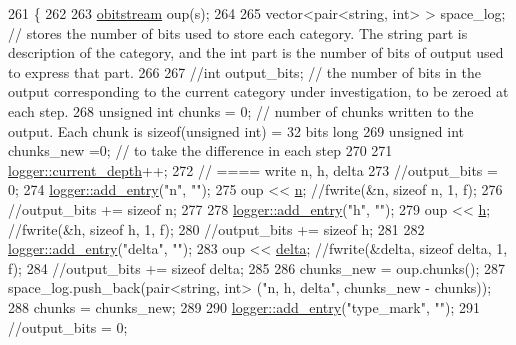 \begin{DoxyCode}
261                                                   \{
262   
263   \hyperlink{classobitstream}{obitstream} oup(s);
264 
265   vector<pair<string, int> > space\_log; \textcolor{comment}{// stores the number of bits used to store each category. The
       string part is description of the category, and the int part is the number of bits of output used to express that
       part.}
266 
267   \textcolor{comment}{//int output\_bits; // the number of bits in the output corresponding to the current category under
       investigation, to be zeroed at each step.}
268   \textcolor{keywordtype}{unsigned} \textcolor{keywordtype}{int} chunks = 0; \textcolor{comment}{// number of chunks written to the output. Each chunk is sizeof(unsigned int) =
       32 bits long}
269   \textcolor{keywordtype}{unsigned} \textcolor{keywordtype}{int} chunks\_new =0; \textcolor{comment}{// to take the difference in each step}
270 
271   \hyperlink{classlogger_a9d29b49bd318a719a8e85b59eac54fe0}{logger::current\_depth}++;
272   \textcolor{comment}{// ==== write n, h, delta}
273   \textcolor{comment}{//output\_bits = 0;}
274   \hyperlink{classlogger_a710163deb17bc81f70d53d285b8ac9ac}{logger::add\_entry}(\textcolor{stringliteral}{"n"}, \textcolor{stringliteral}{""});
275   oup << \hyperlink{classmarked__graph__compressed_a8d841016ddb11cfd33748c8deb6277ba}{n}; \textcolor{comment}{//fwrite(&n, sizeof n, 1, f);}
276   \textcolor{comment}{//output\_bits += sizeof n;}
277 
278   \hyperlink{classlogger_a710163deb17bc81f70d53d285b8ac9ac}{logger::add\_entry}(\textcolor{stringliteral}{"h"}, \textcolor{stringliteral}{""});
279   oup << \hyperlink{classmarked__graph__compressed_af6ff623407b673d08d0cab77b39c2193}{h}; \textcolor{comment}{//fwrite(&h, sizeof h, 1, f);}
280   \textcolor{comment}{//output\_bits += sizeof h;}
281 
282   \hyperlink{classlogger_a710163deb17bc81f70d53d285b8ac9ac}{logger::add\_entry}(\textcolor{stringliteral}{"delta"}, \textcolor{stringliteral}{""});
283   oup << \hyperlink{classmarked__graph__compressed_a8b2aaac68e9332ddc78d88eb60b323a7}{delta}; \textcolor{comment}{//fwrite(&delta, sizeof delta, 1, f);}
284   \textcolor{comment}{//output\_bits += sizeof delta;}
285 
286   chunks\_new = oup.chunks();
287   space\_log.push\_back(pair<string, int> (\textcolor{stringliteral}{"n, h, delta"}, chunks\_new - chunks));
288   chunks = chunks\_new;
289 
290   \hyperlink{classlogger_a710163deb17bc81f70d53d285b8ac9ac}{logger::add\_entry}(\textcolor{stringliteral}{"type\_mark"}, \textcolor{stringliteral}{""});
291   \textcolor{comment}{//output\_bits = 0;}

\end{DoxyCode}
